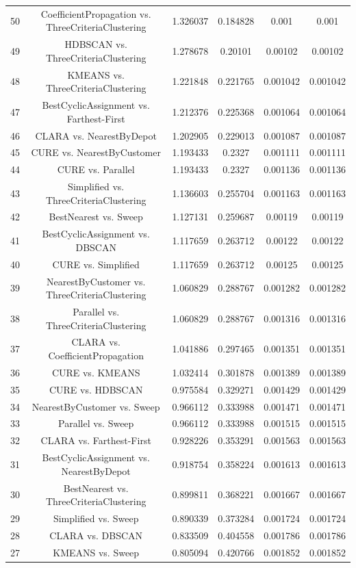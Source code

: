 \documentclass[a4paper,10pt]{article}
\begin{document}
\begin{landscape}
\begin{table}[!htp]
\begin{tabular}{cccccc}
50&CoefficientPropagation vs. ThreeCriteriaClustering&1.326037&0.184828&0.001&0.001\\
49&HDBSCAN vs. ThreeCriteriaClustering&1.278678&0.20101&0.00102&0.00102\\
48&KMEANS vs. ThreeCriteriaClustering&1.221848&0.221765&0.001042&0.001042\\
47&BestCyclicAssignment vs. Farthest-First&1.212376&0.225368&0.001064&0.001064\\
46&CLARA vs. NearestByDepot&1.202905&0.229013&0.001087&0.001087\\
45&CURE vs. NearestByCustomer&1.193433&0.2327&0.001111&0.001111\\
44&CURE vs. Parallel&1.193433&0.2327&0.001136&0.001136\\
43&Simplified vs. ThreeCriteriaClustering&1.136603&0.255704&0.001163&0.001163\\
42&BestNearest vs. Sweep&1.127131&0.259687&0.00119&0.00119\\
41&BestCyclicAssignment vs. DBSCAN&1.117659&0.263712&0.00122&0.00122\\
40&CURE vs. Simplified&1.117659&0.263712&0.00125&0.00125\\
39&NearestByCustomer vs. ThreeCriteriaClustering&1.060829&0.288767&0.001282&0.001282\\
38&Parallel vs. ThreeCriteriaClustering&1.060829&0.288767&0.001316&0.001316\\
37&CLARA vs. CoefficientPropagation&1.041886&0.297465&0.001351&0.001351\\
36&CURE vs. KMEANS&1.032414&0.301878&0.001389&0.001389\\
35&CURE vs. HDBSCAN&0.975584&0.329271&0.001429&0.001429\\
34&NearestByCustomer vs. Sweep&0.966112&0.333988&0.001471&0.001471\\
33&Parallel vs. Sweep&0.966112&0.333988&0.001515&0.001515\\
32&CLARA vs. Farthest-First&0.928226&0.353291&0.001563&0.001563\\
31&BestCyclicAssignment vs. NearestByDepot&0.918754&0.358224&0.001613&0.001613\\
30&BestNearest vs. ThreeCriteriaClustering&0.899811&0.368221&0.001667&0.001667\\
29&Simplified vs. Sweep&0.890339&0.373284&0.001724&0.001724\\
28&CLARA vs. DBSCAN&0.833509&0.404558&0.001786&0.001786\\
27&KMEANS vs. Sweep&0.805094&0.420766&0.001852&0.001852\\

\end{tabular}
\end{table}
\end{landscape}
\end{document}
